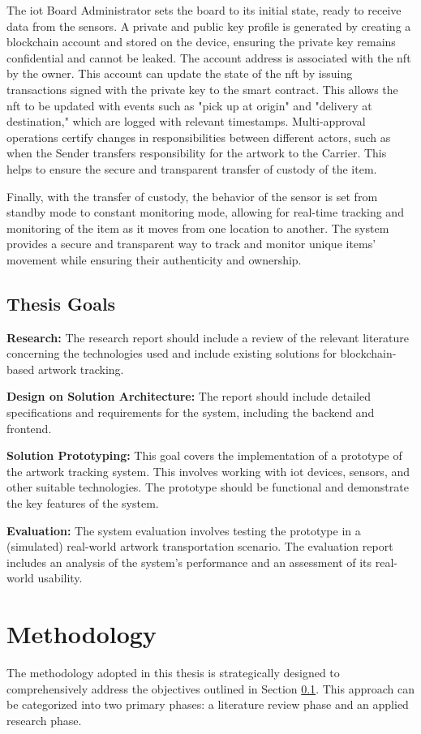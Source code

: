 The \gls{iot} Board Administrator sets the board to its initial state, ready to receive data from the sensors. A private and public key profile is generated by creating a blockchain account and stored on the device, ensuring the private key remains confidential and cannot be leaked. The account address is associated with the \gls{nft} by the owner. This account can update the state of the \gls{nft} by issuing transactions signed with the private key to the smart contract. This allows the \gls{nft} to be updated with events such as "pick up at origin" and "delivery at destination," which are logged with relevant timestamps. Multi-approval operations certify changes in responsibilities between different actors, such as when the Sender transfers responsibility for the artwork to the Carrier. This helps to ensure the secure and transparent transfer of custody of the item. 

Finally, with the transfer of custody, the behavior of the sensor is set from standby mode to constant monitoring mode, allowing for real-time tracking and monitoring of the item as it moves from one location to another. The system provides a secure and transparent way to track and monitor unique items' movement while ensuring their authenticity and ownership.

\subsection{Thesis Goals}
\label{sec:thesis_goals}
\textbf{Research:} The research report should include a review of the relevant literature concerning the technologies used and include existing solutions for blockchain-based artwork tracking.

\textbf{Design on Solution Architecture:} The report should include detailed specifications and requirements for the system, including the backend and frontend.

\textbf{Solution Prototyping:} This goal covers the implementation of a prototype of the artwork tracking system. This involves working with \gls{iot} devices, sensors, and other suitable technologies. The prototype should be functional and demonstrate the key features of the system.

\textbf{Evaluation:} The system evaluation involves testing the prototype in a (simulated) real-world artwork transportation scenario. The evaluation report includes an analysis of the system's performance and an assessment of its real-world usability.

\section{Methodology}
The methodology adopted in this thesis is strategically designed to comprehensively address the objectives outlined in Section \ref{sec:thesis_goals}. This approach can be categorized into two primary phases: a literature review phase and an applied research phase.

